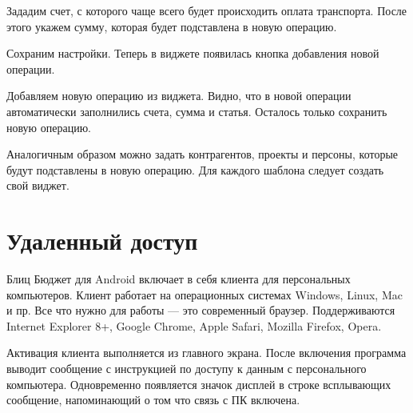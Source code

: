 \documentclass[a4paper,10pt,russian]{sphinxmanual}
\begin{document}
\sphinxAtStartPar
Зададим счет, с которого чаще всего будет происходить оплата транспорта. После этого укажем сумму, которая будет
подставлена в новую операцию.

\noindent{}

\noindent{}

\noindent{}

\sphinxAtStartPar
Сохраним настройки. Теперь в виджете появилась кнопка добавления новой операции.

\noindent{}

\sphinxAtStartPar
Добавляем новую операцию из виджета. Видно, что в новой операции автоматически заполнились счета, сумма и статья. Осталось
только сохранить новую операцию.

\sphinxAtStartPar
Аналогичным образом можно задать контрагентов, проекты и персоны, которые будут подставлены в новую операцию. Для каждого
шаблона следует создать свой виджет.

\sphinxstepscope


\chapter{Удаленный доступ}
\label{\detokenize{remote-access:chapter-remote-access}}\label{\detokenize{remote-access:id1}}\label{\detokenize{remote-access::doc}}
\sphinxAtStartPar
Блиц Бюджет для Android включает в себя клиента для персональных компьютеров. Клиент работает на операционных системах
Windows, Linux, Mac и пр. Все что нужно для работы — это современный браузер. Поддерживаются Internet
Explorer 8+, Google Chrome, Apple Safari, Mozilla Firefox, Opera.

\noindent{}

\noindent{}

\noindent{}

\sphinxAtStartPar
Активация клиента выполняется из главного экрана. После включения программа выводит сообщение с инструкцией
по доступу к данным с персонального компьютера. Одновременно появляется значок дисплей в строке всплывающих
сообщение, напоминающий о том что связь с ПК включена.
\end{document}
